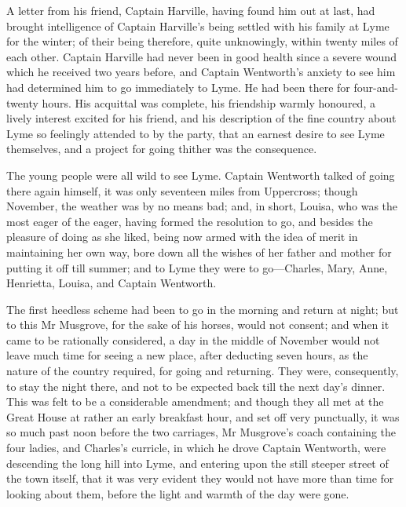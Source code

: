 A letter from his friend, Captain Harville, having found him out at last, had brought intelligence of Captain Harville's being settled with his family at Lyme for the winter; of their being therefore, quite unknowingly, within twenty miles of each other. Captain Harville had never been in good health since a severe wound which he received two years before, and Captain Wentworth's anxiety to see him had determined him to go immediately to Lyme. He had been there for four-and-twenty hours. His acquittal was complete, his friendship warmly honoured, a lively interest excited for his friend, and his description of the fine country about Lyme so feelingly attended to by the party, that an earnest desire to see Lyme themselves, and a project for going thither was the consequence.

The young people were all wild to see Lyme. Captain Wentworth talked of going there again himself, it was only seventeen miles from Uppercross; though November, the weather was by no means bad; and, in short, Louisa, who was the most eager of the eager, having formed the resolution to go, and besides the pleasure of doing as she liked, being now armed with the idea of merit in maintaining her own way, bore down all the wishes of her father and mother for putting it off till summer; and to Lyme they were to go—Charles, Mary, Anne, Henrietta, Louisa, and Captain Wentworth.

The first heedless scheme had been to go in the morning and return at night; but to this Mr Musgrove, for the sake of his horses, would not consent; and when it came to be rationally considered, a day in the middle of November would not leave much time for seeing a new place, after deducting seven hours, as the nature of the country required, for going and returning. They were, consequently, to stay the night there, and not to be expected back till the next day's dinner. This was felt to be a considerable amendment; and though they all met at the Great House at rather an early breakfast hour, and set off very punctually, it was so much past noon before the two carriages, Mr Musgrove's coach containing the four ladies, and Charles's curricle, in which he drove Captain Wentworth, were descending the long hill into Lyme, and entering upon the still steeper street of the town itself, that it was very evident they would not have more than time for looking about them, before the light and warmth of the day were gone.

